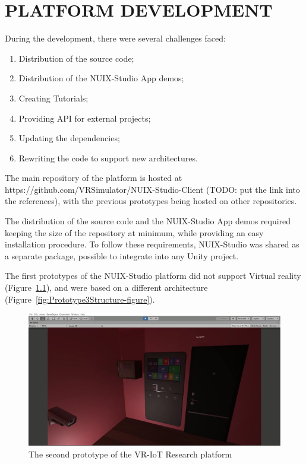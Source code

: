 
\chapter{PLATFORM DEVELOPMENT}

During the development, there were several challenges faced:
\begin{enumerate}
    \item Distribution of the source code;
    \item Distribution of the NUIX-Studio App demos;
    \item Creating Tutorials;
    \item Providing API for external projects;
    \item Updating the dependencies;
    \item Rewriting the code to support new architectures.
\end{enumerate}

The main repository of the platform is hosted at https://github.com/VRSimulator/NUIX-Studio-Client (TODO: put the link into the references), with the previous prototypes being hosted on other repositories.

The distribution of the source code and the NUIX-Studio App demos required keeping the size of the repository at minimum, while providing an easy installation procedure. To follow these requirements, NUIX-Studio was shared as a separate package, possible to integrate into any Unity project.

The first prototypes of the NUIX-Studio platform did not support Virtual reality (Figure~\ref{fig:Prototype2-figure}), and were based on a different architecture (Figure~\ref{fig:Prototype3Structure-figure}).


\begin{figure}
  \centering
  \includegraphics[width=0.6\linewidth]{figures/Prototype2.png}
  \caption{The second prototype of the VR-IoT Research platform}
  \label{fig:Prototype2-figure}
\end{figure}

